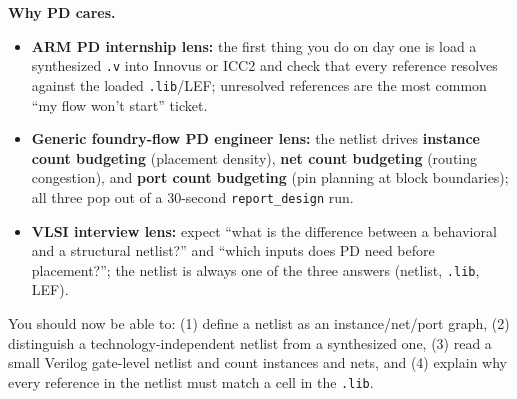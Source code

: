 \begin{pdnote}
\textbf{Why PD cares.}
\begin{itemize}
  \item \textbf{ARM PD internship lens:} the first thing you do on day one is load a synthesized \texttt{.v} into Innovus or ICC2 and check that every reference resolves against the loaded \texttt{.lib}/LEF; unresolved references are the most common ``my flow won't start'' ticket.
  \item \textbf{Generic foundry-flow PD engineer lens:} the netlist drives \textbf{instance count budgeting} (placement density), \textbf{net count budgeting} (routing congestion), and \textbf{port count budgeting} (pin planning at block boundaries); all three pop out of a 30-second \texttt{report\_design} run.
  \item \textbf{VLSI interview lens:} expect ``what is the difference between a behavioral and a structural netlist?'' and ``which inputs does PD need before placement?''; the netlist is always one of the three answers (netlist, \texttt{.lib}, LEF).
\end{itemize}
\end{pdnote}

\begin{checkpoint}
You should now be able to: (1) define a netlist as an instance/net/port graph, (2) distinguish a technology-independent netlist from a synthesized one, (3) read a small Verilog gate-level netlist and count instances and nets, and (4) explain why every reference in the netlist must match a cell in the \texttt{.lib}.

\end{checkpoint}

